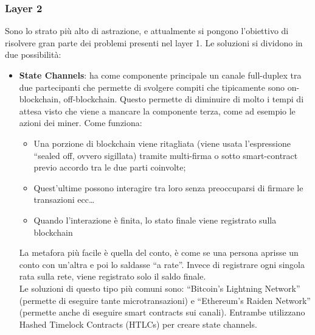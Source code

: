     \subsubsection{Layer 2}
    Sono lo strato più alto di astrazione, e attualmente si pongono l'obiettivo di risolvere gran parte dei problemi presenti nel layer 1. Le soluzioni si dividono in due possibilità:
    \begin{itemize}
        \item \textbf{State Channels}: ha come componente principale un canale full-duplex tra due partecipanti che permette di svolgere compiti che tipicamente sono on-blockchain, off-blockchain. 
        Questo permette di diminuire di molto i tempi di attesa visto che viene a mancare la componente terza, come ad esempio le azioni dei miner.
        Come funziona:
        \begin{itemize}
            \item Una porzione di blockchain viene ritagliata (viene usata l’espressione “sealed off, ovvero sigillata) tramite multi-firma o sotto smart-contract previo accordo tra le due parti coinvolte;
            \item Quest’ultime possono interagire tra loro senza preoccuparsi di firmare le transazioni ecc…
            \item Quando l’interazione è finita, lo stato finale viene registrato sulla blockchain
        \end{itemize}
        La metafora più facile è quella del conto, è come se una persona aprisse un conto con un’altra e poi lo saldasse “a rate”. Invece di registrare ogni singola rata sulla rete, viene 
        registrato solo il saldo finale.\\
        Le soluzioni di questo tipo più comuni sono: “Bitcoin’s Lightning Network” (permette di eseguire tante microtransazioni) e “Ethereum’s Raiden Network” (permette anche di eseguire smart contracts 
        sui canali). Entrambe utilizzano Hashed Timelock Contracts (HTLCs) per creare state channels.
    \end{itemize}
